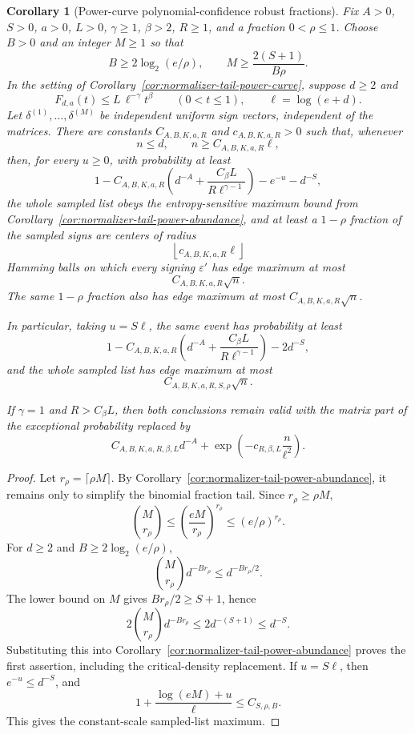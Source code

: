 \documentclass[11pt]{amsart}
\numberwithin{equation}{section}
\newtheorem{corollary}[theorem]{Corollary}
\theoremstyle{definition}
\theoremstyle{remark}
\newcommand{\eps}{\varepsilon}
\begin{document}
\begin{corollary}[Power-curve polynomial-confidence robust fractions]
\label{cor:normalizer-tail-power-robust-fraction-confidence}
Fix \(A>0\), \(S>0\), \(a>0\), \(L>0\), \(\gamma\ge1\), \(\beta>2\),
\(R\ge1\), and a fraction \(0<\rho\le1\).  Choose \(B>0\) and an integer
\(M\ge1\) so that
\[
  B\ge 2\log_2(e/\rho),
  \qquad
  M\ge \frac{2(S+1)}{B\rho}.
\]
In the setting of Corollary~\ref{cor:normalizer-tail-power-curve}, suppose
\(d\ge2\) and
\[
  F_{d,a}(t)\le L\,\ell^{-\gamma}t^\beta
  \qquad(0<t\le1),
  \qquad \ell=\log(e+d).
\]
Let \(\delta^{(1)},\ldots,\delta^{(M)}\) be independent uniform sign vectors,
independent of the matrices.  There are constants \(C_{A,B,K,a,R}\) and
\(c_{A,B,K,a,R}>0\) such that, whenever
\[
  n\le d,\qquad n\ge C_{A,B,K,a,R}\ell ,
\]
then, for every \(u\ge0\), with probability at least
\[
  1-C_{A,B,K,a,R}\left(d^{-A}+\frac{C_\beta L}{R\ell^{\gamma-1}}\right)
  -e^{-u}-d^{-S},
\]
the whole sampled list obeys the entropy-sensitive maximum bound from
Corollary~\ref{cor:normalizer-tail-power-abundance}, and at least a
\(1-\rho\) fraction of the sampled signs are centers of radius
\[
  \left\lfloor c_{A,B,K,a,R}\ell\right\rfloor
\]
Hamming balls on which every signing \(\eps'\) has edge maximum at most
\[
  C_{A,B,K,a,R}\sqrt n .
\]
The same \(1-\rho\) fraction also has edge maximum at most
\(C_{A,B,K,a,R}\sqrt n\).

In particular, taking \(u=S\ell\), the same event has probability at least
\[
  1-C_{A,B,K,a,R}\left(d^{-A}+\frac{C_\beta L}{R\ell^{\gamma-1}}\right)
  -2d^{-S},
\]
and the whole sampled list has edge maximum at most
\[
  C_{A,B,K,a,R,S,\rho}\sqrt n .
\]

If \(\gamma=1\) and \(R>C_\beta L\), then both conclusions remain valid with the
matrix part of the exceptional probability replaced by
\[
  C_{A,B,K,a,R,\beta,L}d^{-A}
  +\exp\left(-c_{R,\beta,L}\frac n{\ell^2}\right).
\]
\end{corollary}

\begin{proof}
Let \(r_\rho=\lceil\rho M\rceil\).  By
Corollary~\ref{cor:normalizer-tail-power-abundance}, it remains only to
simplify the binomial fraction tail.  Since \(r_\rho\ge\rho M\),
\[
  \binom{M}{r_\rho}\le \left(\frac{eM}{r_\rho}\right)^{r_\rho}
  \le (e/\rho)^{r_\rho}.
\]
For \(d\ge2\) and \(B\ge2\log_2(e/\rho)\),
\[
  \binom{M}{r_\rho}d^{-B r_\rho}
  \le d^{-B r_\rho/2}.
\]
The lower bound on \(M\) gives \(B r_\rho/2\ge S+1\), hence
\[
  2\binom{M}{r_\rho}d^{-B r_\rho}\le 2d^{-(S+1)}\le d^{-S}.
\]
Substituting this into Corollary~\ref{cor:normalizer-tail-power-abundance}
proves the first assertion, including the critical-density replacement.  If
\(u=S\ell\), then \(e^{-u}\le d^{-S}\), and
\[
  1+\frac{\log(eM)+u}{\ell}
  \le C_{S,\rho,B}.
\]
This gives the constant-scale sampled-list maximum.
\end{proof}
\end{document}
